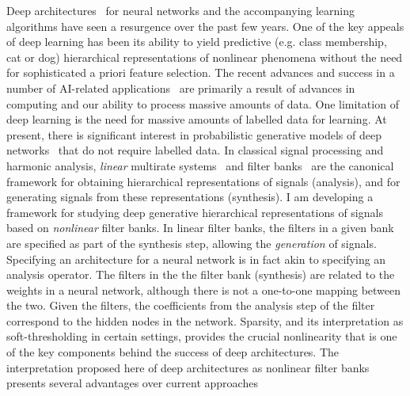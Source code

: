 \documentclass[12pt]{article}
\begin{document}
Deep architectures~\cite{lecun2015deep} for neural networks and the accompanying learning algorithms have seen a resurgence over the past few years. One of the key appeals of deep learning has been its ability to yield predictive (e.g. class membership, cat or dog) hierarchical representations of nonlinear phenomena without the need for sophisticated a priori feature selection. The recent advances and success in a number of AI-related applications~\cite{bengio2009learning} are primarily a result of advances in computing and our ability to process massive amounts of data. One limitation of deep learning is the need for massive amounts of labelled data for learning. At present, there is significant interest in probabilistic generative models of deep networks~\cite{patel2015probabilistic} that do not require labelled data. %
In classical signal processing and harmonic analysis, \emph{linear} multirate systems~\cite{fliege1994multirate} and filter banks~\cite{strang1996wavelets,daubechies1992ten} are the canonical framework for obtaining hierarchical representations of signals (analysis), and for generating signals from these representations (synthesis). I am developing a framework for studying deep generative hierarchical representations of signals based on \emph{nonlinear} filter banks. In linear filter banks, the filters in a given bank are specified as part of the synthesis step, allowing the \emph{generation} of signals. Specifying an architecture for a neural network is in fact akin to specifying an analysis operator. The filters in the the filter bank (synthesis) are related to the weights in a neural network, although there is not a one-to-one mapping between the two. Given the filters, the coefficients from the analysis step of the filter correspond to the hidden nodes in the network. Sparsity, and its interpretation as soft-thresholding in certain settings, provides the crucial nonlinearity that is one of the key components behind the success of deep architectures. The interpretation proposed here of deep architectures as nonlinear filter banks presents several advantages over current approaches
\end{document}

